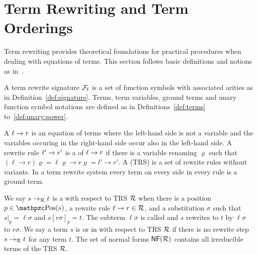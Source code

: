 
\section{Term Rewriting and Term Orderings}\label{sec:termrewriting}

Term rewriting provides theoretical foundations for practical procedures
when dealing with equations of terms.
This section follows basic definitions and notions as in~\cite{AM2015L}.

\begin{definition}\label{def:rewrite:signature}
	A term rewrite signature \( {\mathcal{F}_{\mathsf{f}}} \) is a set of function symbols
	with associated arities
	as in Definition~\ref{def:signature}.
	Terms, term variables, ground terms and unary function symbol notations
	are defined as in Definitions~\ref{def:terms} to~\ref{def:unary:power}.
\end{definition}


\begin{definition}\label{def:rewriterule}
	A  \( \ell\xrightarrow[{}]{} r \) is an equation of terms where the left-hand side is not a variable
	and the variables occuring in the right-hand side occur also in the left-hand side.
	A rewrite rule \( \ell'\xrightarrow[{}]{} r' \) is a  of \( \ell\xrightarrow[{}]{} r \) if there is a variable renaming \( \varrho \)
	such that
	\( (\ell\rightarrow r)\varrho = \ell\varrho\rightarrow r\varrho = l'\rightarrow r' \).
	A  (TRS) is a set of rewrite rules without variants.
	In a  term rewrite system every term on every side in every rule is a ground term.
\end{definition}

%
\begin{definition}
	We say \( s\rightarrow_{\mathcal{R}} t \) is a
	 with respect to TRS \( \mathcal{R} \)
	when there is a position \( p \in \pos(s) \),
	a rewrite rule \( \ell\xrightarrow[{}]{} r\in\mathcal{R} \),
	and a substitution \( \sigma \) such that
	\( s|_p=\ell\sigma \) and \( s{[r\sigma]}_p = t \).
		The subterm \( \ell\sigma \) is called  and
	\( s \) rewrites to \( t \) by  \( \ell\sigma \) to  \( r\sigma \).
	We say a term \( s \) is  or in  with respect to TRS \( \mathcal{R} \) if there is no rewrite step \( s\rightarrow_{\mathcal{R}} t \) for any term \( t \).
	The set of normal forms \( \mathsf{NF} (\mathcal{R}) \) contains all irreducible terms of the TRS \( \mathcal{R} \).

	\end{definition}


